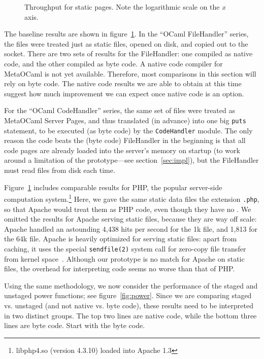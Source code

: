 \documentclass{elsart}
\def\MOC{MetaOCaml\xspace}
\newcommand{\myfig}[3]{%
  \begin{figure}[tbp]%
    #3%
    \caption{#2}%
    \label{fig:#1}%
  \end{figure}}
\newcommand{\gnuplot}[2]{%
  \myfig{#1}{#2}{\centering}}
\begin{document}
\gnuplot{static}{Throughput for static pages.  Note the logarithmic
  scale on the \textit x axis.}

The baseline results are shown in figure~\ref{fig:static}.  In the
``OCaml FileHandler'' series, the files were treated just as static
files, opened on disk, and copied out to the socket.  There are two
sets of results for the FileHandler: one compiled as native code, and
the other compiled as byte code.  A native code compiler for MetaOCaml
is not yet available.  Therefore, most comparisons in this section
will rely on byte code.  The native code results we are able to obtain
at this time suggest how much improvement we can expect once native
code is an option.

For the ``OCaml CodeHandler'' series, the same set of files were
treated as \MOC Server Pages, and thus translated (in advance) into
one big \texttt{puts} statement, to be executed (as byte code) by the
\texttt{CodeHandler} module.  The only reason the code beats the (byte
code) FileHandler in the beginning is that all code pages are already
loaded into the server's memory on startup (to work around a
limitation of the prototype---see section~\ref{sec:impl}), but the
FileHandler must read files from disk each time.

Figure~\ref{fig:static} includes comparable results for PHP, the
popular server-side computation system.\footnote{libphp4.so
  (version 4.3.10) loaded into Apache 1.3} Here, we gave the same
static data files the extension \texttt{.php}, so that Apache
would treat them as PHP code, even though they have no
.
We omitted the results for Apache serving static files, because they
are way off scale: Apache handled an astounding 4,438 hits per second
for the 1k file, and 1,813 for the 64k file.  Apache is heavily
optimized for serving static files: apart from caching, it uses the
special \texttt{sendfile(2)} system call for zero-copy file transfer
from kernel space~\cite{tranter03sendfile}.  Although our prototype is
no match for Apache on static files, the overhead for interpreting
code seems no worse than that of PHP.

Using the same methodology, we now consider the performance of the
staged and unstaged power functions; see figure~\ref{fig:power}.
Since we are comparing staged vs. unstaged (and not native vs. byte
code), these results need to be interpreted in two distinct groups.
The top two lines are native code, while the bottom three lines are
byte code.  Start with the byte code.
\end{document}
